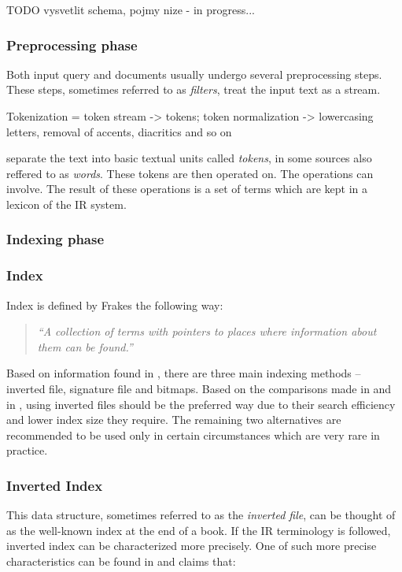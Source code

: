 TODO vysvetlit schema, pojmy nize - in progress...

\subsubsection{Preprocessing phase}

Both input query and documents usually undergo several preprocessing steps. These steps, sometimes referred to as \textsl{filters},   
treat the input text as a stream. 

Tokenization = token stream -> tokens; token normalization -> lowercasing letters, removal of accents, diacritics and so on

separate the text into basic textual units called \textsl{tokens}, in some sources also reffered to as \textsl{words}. These tokens are then operated on. The operations can involve. The result of these operations is a set of terms which are kept in a lexicon of the IR system. 

\subsubsection{Indexing phase}

\subsubsection*{Index}

Index is defined by Frakes \cite{IRDataAlgorithms} the following way: 
	\begin{quote}
	\textsl{``A collection of terms with pointers to places where information about them can be found.''} 	
	\end{quote}
Based on information found in \cite{ManningRaghavanSchuetze08, IRDataAlgorithms, Witten:1999:MGC:323905}, there are three main indexing methods – inverted file, signature file and bitmaps. Based on the comparisons made in \cite{Witten:1999:MGC:323905} and in \cite{Zobel:1996:GPC:234889.234891}, using inverted files should be the preferred way due to their search efficiency and lower index size they require. The remaining two alternatives are recommended to be used only in certain circumstances which are very rare in practice. 

\subsubsection*{Inverted Index}

This data structure, sometimes referred to as the \textit{inverted file}, can be thought of as the well-known index at the end of a book. If the IR terminology is followed, inverted index can be characterized more precisely. One of such more precise characteristics can be found in \cite{Witten:1999:MGC:323905} and claims that:

